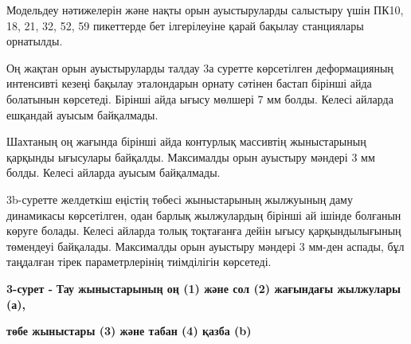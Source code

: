 Модельдеу нәтижелерін және нақты орын ауыстыруларды салыстыру үшін ПК10,
18, 21, 32, 52, 59 пикеттерде бет ілгерілеуіне қарай бақылау станциялары
орнатылды.

Оң жақтан орын ауыстыруларды талдау 3а суретте көрсетілген деформацияның
интенсивті кезеңі бақылау эталондарын орнату сәтінен бастап бірінші айда
болатынын көрсетеді. Бірінші айда ығысу мөлшері 7 мм болды. Келесі
айларда ешқандай ауысым байқалмады.

Шахтаның оң жағында бірінші айда контурлық массивтің жыныстарының
қарқынды ығысулары байқалды. Максималды орын ауыстыру мәндері 3 мм
болды. Келесі айларда ауысым байқалмады.

3b-суретте желдеткіш еңістің төбесі жыныстарының жылжуының даму
динамикасы көрсетілген, одан барлық жылжулардың бірінші ай ішінде
болғанын көруге болады. Келесі айларда толық тоқтағанға дейін ығысу
қарқындылығының төмендеуі байқалады. Максималды орын ауыстыру мәндері 3
мм-ден аспады, бұл таңдалған тірек параметрлерінің тиімділігін
көрсетеді.


{\bfseries 3-сурет -} {\bfseries Тау жыныстарының оң (1) және сол (2)
жағындағы жылжулары (а),}

{\bfseries төбе жыныстары (3) және табан (4) қазба (b)}

